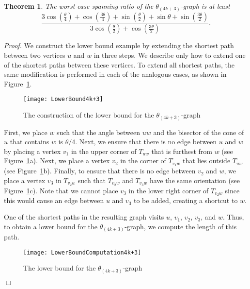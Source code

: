 \documentclass[12pt]{article}
\newtheorem{theo}[defin]{Theorem}
\newenvironment{theorem}{\begin{theo} \sl}{\end{theo}}
\newenvironment{proof}{\emph{Proof.}}{\hfill $\Box$\\}
\newcommand{\graph}[1]{\ensuremath{\theta_{(4 k + #1)}}-graph\xspace}
\newcommand{\canon}[2]{\ensuremath{T_{#1 #2}}}
\begin{document}
\begin{theorem}
  \label{theo:LowerBound4k+3}
  The worst case spanning ratio of the \graph{3} is at least \[\frac{3\cos\left(\frac{\theta}{4}\right)+\cos\left(\frac{3\theta}{4}\right)+\sin\left(\frac{\theta}{2}\right)+\sin \theta +\sin\left(\frac{3\theta}{2}\right)}{3\cos\left(\frac{\theta}{2}\right)+\cos\left(\frac{3\theta}{2}\right)}.\] 
\end{theorem}
\begin{proof}
We construct the lower bound example by extending the shortest path between two vertices $u$ and $w$ in three steps. We describe only how to extend one of the shortest paths between these vertices. To extend all shortest paths, the same modification is performed in each of the analogous cases, as shown in Figure~\ref{fig:LowerBound4k+3}. 

\begin{figure}[ht]
  \begin{center}
    \texttt{[image: LowerBound4k+3]}
  \end{center}
  \vspace{-1em}
  \caption{The construction of the lower bound for the \graph{3}}
  \label{fig:LowerBound4k+3}
\end{figure}

First, we place $w$ such that the angle between $u w$ and the bisector of the cone of $u$ that contains $w$ is $\theta/4$. Next, we ensure that there is no edge between $u$ and $w$ by placing a vertex $v_1$ in the upper corner of \canon{u}{w} that is furthest from $w$ (see Figure~\ref{fig:LowerBound4k+3}a). Next, we place a vertex $v_2$ in the corner of \canon{v_1}{w} that lies outside \canon{u}{w} (see Figure~\ref{fig:LowerBound4k+3}b). Finally, to ensure that there is no edge between $v_2$ and $w$, we place a vertex $v_3$ in \canon{v_2}{w} such that \canon{v_2}{w} and \canon{v_3}{w} have the same orientation (see Figure~\ref{fig:LowerBound4k+3}c). Note that we cannot place $v_3$ in the lower right corner of \canon{v_2}{w} since this would cause an edge between $u$ and $v_3$ to be added, creating a shortcut to $w$. 

One of the shortest paths in the resulting graph visits $u$, $v_1$, $v_2$, $v_3$, and $w$. Thus, to obtain a lower bound for the \graph{3}, we compute the length of this path. 

\begin{figure}[ht]
  \begin{center}
    \texttt{[image: LowerBoundComputation4k+3]}
  \end{center}
  \caption{The lower bound for the \graph{3}}
  \label{fig:LowerBoundComputation4k+3}
\end{figure}


\end{proof}
\end{document}
